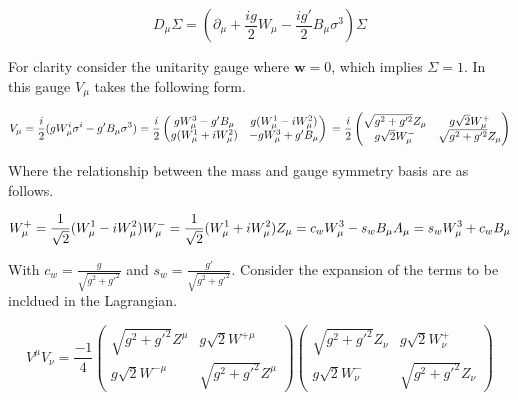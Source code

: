 \begin{equation}
D_{\mu}\Sigma = (\partial_{\mu} + \frac{ig}{2}W_{\mu} - \frac{ig'}{2}B_{\mu}\sigma^{3})\Sigma
\end{equation}

For clarity consider the unitarity gauge where $\textbf{w} = 0$, which implies $\Sigma = 1$.  In this gauge $V_{\mu}$ takes the following form.

\begin{equation*}
V_{\mu} = \frac{i}{2}(gW_{\mu}^{i}\sigma^{i} - g'B_{\mu}\sigma^{3}) = \frac{i}{2}
  \begin{pmatrix}
    gW_{\mu}^{3} - g'B_{\mu} & g(W_{\mu}^{1} - iW_{\mu}^{2}) \\
    g(W_{\mu}^{1} + iW_{\mu}^{2}) & -gW_{\mu}^{3} + g'B_{\mu}
  \end{pmatrix} \\
= \frac{i}{2}
  \begin{pmatrix}
    \sqrt{g^{2} + g'^{2}} Z_{\mu} & g\sqrt{2}W^{+}_{\mu} \\
    g\sqrt{2}W^{-}_{\mu} & \sqrt{g^{2} + g'^{2}} Z_{\mu}
  \end{pmatrix}
\end{equation*}

Where the relationship between the mass and gauge symmetry basis are as follows.

\begin{equation}
  W^{+}_{\mu} = \frac{1}{\sqrt{2}}(W^{1}_{\mu} - i W^{2}_{\mu}) \\
  W^{-}_{\mu} = \frac{1}{\sqrt{2}}(W^{1}_{\mu} + i W^{2}_{\mu}) \\
  Z_{\mu} = c_{w}W^{3}_{\mu} - s_{w}B_{\mu} \\
  A_{\mu} = s_{w}W^{3}_{\mu} + c_{w}B_{\mu}
\end{equation}

With $c_{w} = \frac{g}{\sqrt{g^{2} + g'^{2}}}$ and $s_{w} = \frac{g'}{\sqrt{g^{2} + g'^{2}}}$.  Consider the expansion of the terms to be incldued in the Lagrangian.

\begin{equation}
V^{\mu}V_{\nu} = \frac{-1}{4}
  \begin{pmatrix}
    \sqrt{g^{2} + g'^{2}} Z^{\mu} & g\sqrt{2}W^{+\mu} \\
    g\sqrt{2}W^{-\mu} & \sqrt{g^{2} + g'^{2}} Z^{\mu}
  \end{pmatrix}
  \begin{pmatrix}
    \sqrt{g^{2} + g'^{2}} Z_{\nu} & g\sqrt{2}W^{+}_{\nu} \\
    g\sqrt{2}W^{-}_{\nu} & \sqrt{g^{2} + g'^{2}} Z_{\nu}
  \end{pmatrix}
\end{equation}

